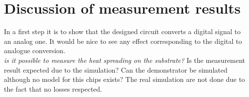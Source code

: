 \section{Discussion of measurement results}
In a first step it is to show that the designed circuit converts a digital signal to an analog one. It would be nice to see any effect corresponding to the digital to analogue conversion. \\
\textit{is it possible to measure the heat spreading on the substrate?}
Is the measurement result expected due to the simulation? Can the demonstrator be simulated although no model for this chips exists? The real simulation are not done due to the fact that no losses respected.


